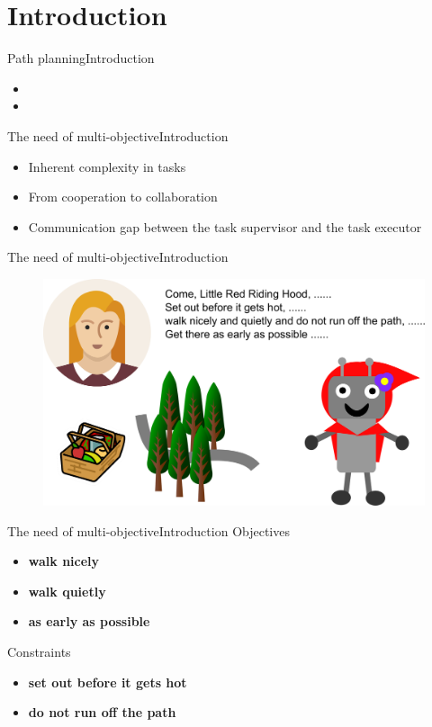 \section{Introduction}

\begin{frame}{Path planning}{Introduction}
\begin{itemize}
\item
\item 
\end{itemize}
\end{frame}

\begin{frame}{The need of multi-objective}{Introduction}
\begin{itemize}
\item Inherent complexity in tasks
\item From cooperation to collaboration
\item Communication gap between the task supervisor and the task executor
\end{itemize}
\end{frame}

\begin{frame}{The need of multi-objective}{Introduction}
	\begin{figure}
		\centering
		\includegraphics[width=\linewidth]{figure/task_assign}
		\label{fig:task_assign}
	\end{figure}
\end{frame}

\begin{frame}{The need of multi-objective}{Introduction}
Objectives
\begin{itemize}
\item \textbf{walk nicely}
\item \textbf{walk quietly}
\item \textbf{as early as possible}
\end{itemize}
Constraints
\begin{itemize}
\item  \textbf{set out before it gets hot}
\item \textbf{do not run off the path}
\end{itemize}
\end{frame}

